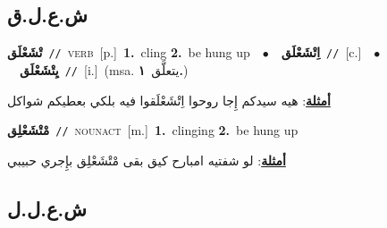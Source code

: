 \documentclass[10pt,a4paper,twoside]{article} %
\begin{document}
\begin{multicols}{2}
\vspace{-3mm}
\subsection*{\color{blue}\foreignlanguage{arabic}{ش.ع.ل.ق}\color{blue}{}} 

{\setlength\topsep{0pt}\textbf{\foreignlanguage{arabic}{تْشَعْلَق}}\ {\color{gray}\texttt{//}\color{black}}\ \textsc{verb}\ [p.]\ \textbf{1.}~cling  \textbf{2.}~be hung up\ \ $\bullet$\ \ \setlength\topsep{0pt}\textbf{\foreignlanguage{arabic}{اِتْشَعْلَق}}\ {\color{gray}\texttt{//}\color{black}}\ [c.]\ \ $\bullet$\ \ \setlength\topsep{0pt}\textbf{\foreignlanguage{arabic}{يِتْشَعْلَق}}\ {\color{gray}\texttt{//}\color{black}}\ [i.]\ \color{gray}(msa. \foreignlanguage{arabic}{يتعلَّق}~\foreignlanguage{arabic}{\textbf{١.}})\color{black}\  \begin{flushright}\color{gray}\foreignlanguage{arabic}{\textbf{\underline{\foreignlanguage{arabic}{أمثلة}}}: هيه سيدكم إِجا روحوا اِتْشَعْلَقوا فيه بلكي بعطيكم شواكل}\end{flushright}\color{black}} \vspace{2mm}

{\setlength\topsep{0pt}\textbf{\foreignlanguage{arabic}{مْتْشَعْلِق}}\ {\color{gray}\texttt{//}\color{black}}\ \textsc{noun\textunderscore act}\ [m.]\ \textbf{1.}~clinging  \textbf{2.}~be hung up\  \begin{flushright}\color{gray}\foreignlanguage{arabic}{\textbf{\underline{\foreignlanguage{arabic}{أمثلة}}}: لو شفتيه امبارح كيق بقى مْتْشَعْلِق بإِجري حبيبي}\end{flushright}\color{black}} \vspace{2mm}

\vspace{-3mm}
\subsection*{\color{blue}\foreignlanguage{arabic}{ش.ع.ل.ل}\color{blue}{}} 


\end{multicols}
\end{document}
